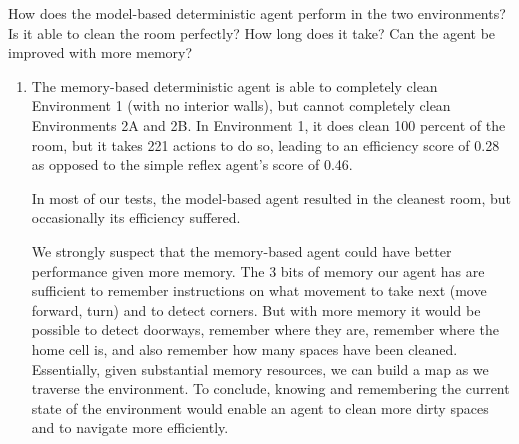 \documentclass{article}
\newenvironment{Question}[2][Question]{\begin{trivlist}
\item[\hskip \labelsep {\bfseries #1}\hskip \labelsep {\bfseries #2.}]}{\end{trivlist}}
\begin{document}
\begin{Question}{5}How does the model-based deterministic agent perform in the two environments? Is it able to clean the room perfectly? How long does it take? Can the agent be improved with more memory?\\

\begin{enumerate}
\item The memory-based deterministic agent is able to completely clean Environment 1 (with no interior walls), but cannot completely clean Environments 2A and 2B. In Environment 1, it does clean 100 percent of the room, but it takes 221 actions to do so, leading to an efficiency score of 0.28 as opposed to the simple reflex agent's score of 0.46.

In most of our tests, the model-based agent resulted in the cleanest room, but occasionally its efficiency suffered.

We strongly suspect that the memory-based agent could have better performance given more memory. The 3 bits of memory our agent has are sufficient to remember instructions on what movement to take next (move forward, turn) and to detect corners. But with more memory it would be possible to detect doorways, remember where they are, remember where the home cell is, and also remember how many spaces have been cleaned. Essentially, given substantial memory resources, we can build a map as we traverse the environment.  To conclude, knowing and remembering the current state of the environment would enable an agent to clean more dirty spaces and to navigate more efficiently.
\end{enumerate}

\end{Question}


\end{document}
